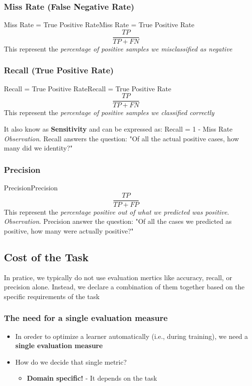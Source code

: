 \documentclass[a4paper]{article}
\theoremstyle{definition}
\begin{document}
\subsubsection{Miss Rate (False Negative Rate)}
\begin{definition}{Miss Rate = True Positive Rate}{Miss Rate = True Positive Rate}
\[
  \frac{TP}{TP + FN}
\]
This represent the \textit{percentage of positive samples we misclassified as negative}
\end{definition}
\subsubsection{Recall (True Positive Rate)}
\begin{definition}{Recall = True Positive Rate}{Recall = True Positive Rate}
\[
  \frac{TP}{TP + FN}
\]
This represent the \textit{percentage of positive samples we classified correctly}
\end{definition}
It also know as \textbf{Sensitivity} and can be expressed as: Recall = 1 - Miss Rate
\vspace{1em}
\noindent
\newline
\textit{Observation}. Recall answers the question: "Of all the actual positive cases, how many did we identity?"
\subsubsection{Precision}
\begin{definition}{Precision}{Precision} 
\[
  \frac{TP}{TP + FP}
\] 
This represent the \textit{percentage positive out of what we predicted was positive}.
\vspace{1em}
\noindent
\newline
\textit{Observation}. Precision answer the question: "Of all the cases
we predicted as positive, how many were actually positive?"
\end{definition}
\subsection{Cost of the Task}
In pratice, we typically do not use evaluation mertics like accuracy, recall, 
or precision alone. Instead, we declare a combination of them together based on the specific 
requirements of the task
\subsubsection{The need for a single evaluation measure}
\begin{itemize}
    \item In oreder to optimize a learner automatically (i.e., during training), we need a \textbf{single evaluation measure}
    \item How do we decide that single metric?
    \begin{itemize}
        \item \textbf{Domain specific!} - It depends on the task
    \end{itemize}
\end{itemize}
\end{document}
